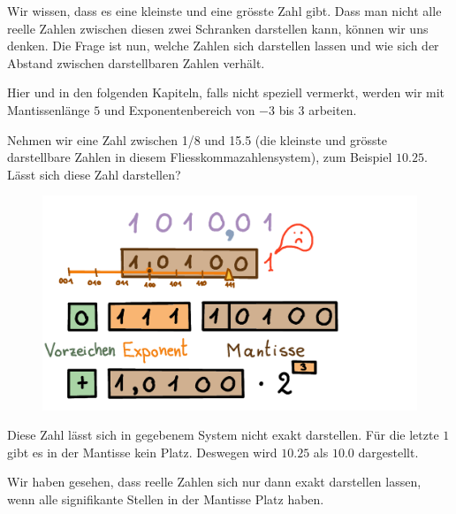 Wir wissen, dass es eine kleinste und eine grösste Zahl gibt. Dass man nicht alle reelle Zahlen zwischen diesen zwei Schranken darstellen kann, können wir uns denken. Die Frage ist nun, welche Zahlen sich darstellen lassen und wie sich der Abstand zwischen darstellbaren Zahlen verhält.

Hier und in den folgenden Kapiteln, falls nicht speziell vermerkt, werden wir mit Mantissenlänge \(5\) und Exponentenbereich von \(-3\) bis \(3\) arbeiten.

\begin{beispiel}
Nehmen wir eine Zahl zwischen 1/8 und 15.5 (die kleinste und grösste darstellbare Zahlen in diesem Fliesskommazahlensystem), zum Beispiel \(10.25\). Lässt sich diese Zahl darstellen?

\begin{figure}[H]
\centering
\includegraphics[width=0.75\linewidth]{Pictures/ZahlenDarstellen10-25.png}
\end{figure}

Diese Zahl lässt sich in gegebenem System nicht exakt darstellen. Für die letzte \(1\) gibt es in der Mantisse kein Platz. Deswegen wird \(10.25\) als \(10.0\) dargestellt.
\end{beispiel}

Wir haben gesehen, dass reelle Zahlen sich nur dann exakt darstellen lassen, wenn alle signifikante Stellen in der Mantisse Platz haben.


